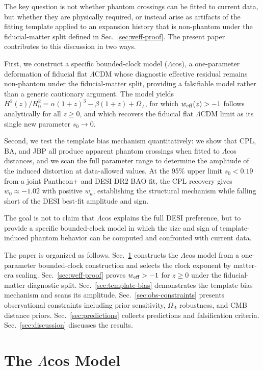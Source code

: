 \documentclass[
  aps,
  prd,
  onecolumn,         %
  nofootinbib,
  longbibliography
]{revtex4-2}
\begin{document}
The key question is not whether phantom crossings can be fitted to
current data, but whether they are physically required, or instead arise
as artifacts of the fitting template applied to an expansion history that is non-phantom under the fiducial-matter split defined in Sec.~\ref{sec:weff-proof}. The present paper contributes to this discussion in two ways.

\pagebreak

First, we construct a specific bounded-clock model ($\Lambda$cos), a one-parameter
deformation of fiducial flat $\Lambda$CDM whose diagnostic effective residual
remains non-phantom under the fiducial-matter split, providing a
falsifiable model rather than a generic cautionary argument. The model yields $H^2(z)/H_0^2 = \alpha(1+z)^3
- \beta(1+z) + \Omega_\Lambda$, for which $w_{\rm eff}(z) > -1$ follows
analytically for all $z \geq 0$, and which recovers the fiducial flat
$\Lambda$CDM limit as its single new parameter $s_0 \to 0$. 

Second, we test the template bias mechanism quantitatively: we show that CPL, BA, and JBP
all produce apparent phantom crossings when fitted to $\Lambda$cos distances,
and we scan the full parameter range to determine the amplitude of the
induced distortion at data-allowed values. At the 95\% upper limit
$s_0 < 0.19$ from a joint Pantheon+ and DESI DR2 BAO fit, the CPL
recovery gives $w_0 \approx -1.02$ with positive $w_a$, establishing the
structural mechanism while falling short of the DESI best-fit amplitude
and sign. 

The goal is not to claim that $\Lambda$cos explains the full DESI
preference, but to provide a specific bounded-clock model in which the size and
sign of template-induced phantom behavior can be computed and confronted
with current data.

The paper is organized as follows. Sec.~\ref{sec:lcos-model} constructs the $\Lambda$cos model
from a one-parameter bounded-clock construction and selects the clock exponent by
matter-era scaling. Sec.~\ref{sec:weff-proof} proves $w_{\rm eff} > -1$ for $z \geq 0$ under the fiducial-matter diagnostic split. Sec.~\ref{sec:template-bias} demonstrates the template bias mechanism and scans
its amplitude. Sec.~\ref{sec:obs-constraints} presents observational constraints including
prior sensitivity, $\Omega_\Lambda$ robustness, and CMB distance priors. Sec.~\ref{sec:predictions}
collects predictions and falsification criteria. Sec.~\ref{sec:discussion} discusses the
results.

\section{The $\Lambda$cos Model}\label{sec:lcos-model}
\end{document}
